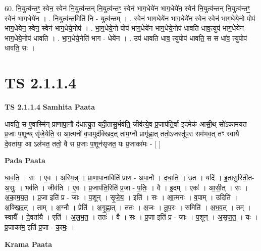 \documentclass[17pt]{extarticle}
\begin{document}
60. नि॒युत्व॑न्तꣳ॒॒ स्वेन॒ स्वेन॑ नि॒युत्व॑न्तन् नि॒युत्व॑न्तꣳ॒॒ स्वेन॑ भाग॒धेये॑न भाग॒धेये॑न॒ स्वेन॑ नि॒युत्व॑न्तन् नि॒युत्व॑न्तꣳ॒॒ स्वेन॑ भाग॒धेये॑न । . नि॒युत्व॑न्त॒मिति॑ नि - युत्व॑न्तम् । . स्वेन॑ भाग॒धेये॑न भाग॒धेये॑न॒ स्वेन॒ स्वेन॑ भाग॒धेये॒नो पोप॑ भाग॒धेये॑न॒ स्वेन॒ स्वेन॑ भाग॒धेये॒नोप॑ । . भा॒ग॒धेये॒नो पोप॑ भाग॒धेये॑न भाग॒धेये॒नोप॑ धावति धाव॒त्युप॑ भाग॒धेये॑न भाग॒धेये॒नोप॑ धावति । . भा॒ग॒धेये॒नेति॑ भाग - धेये॑न । . उप॑ धावति धाव॒ त्युपोप॑ धावति॒ स स धा॑व॒ त्युपोप॑ धावति॒ सः । \newline
\pagebreak
{}

\section{ TS 2.1.1.4 }

\textbf{TS 2.1.1.4 } \newline
\textbf{Samhita Paata} \newline

धावति॒ स ए॒वास्मि॑न् प्राणापा॒नौ द॑धात्यु॒त यदी॒तासु॒र्भव॑ति॒ जीव॑त्ये॒व प्र॒जाप॑ति॒र्वा इ॒दमेक॑ आसी॒थ् सो॑ऽकामयत प्र॒जाः प॒शून्थ् सृ॑जे॒येति॒ स आ॒त्मनो॑ व॒पामुद॑क्खिद॒त् ताम॒ग्नौ प्रागृ॑ह्णा॒त् ततो॒ऽजस्तू॑प॒रः सम॑भव॒त् तꣳ स्वायै॑ दे॒वता॑या॒ आ ऽल॑भत॒ ततो॒ वै स प्र॒जाः प॒शून॑सृजत॒ यः प्र॒जाका॑मः - [  ] \newline

\textbf{Pada Paata} \newline

धा॒व॒ति॒ । सः । ए॒व । अ॒स्मि॒न्न् । प्रा॒णा॒पा॒नाविति॑ प्राण - अ॒पा॒नौ । द॒धा॒ति॒ । उ॒त । यदि॑ । इ॒तासु॒रिती॒त-अ॒सुः॒ । भव॑ति । जीव॑ति । ए॒व । प्र॒जाप॑ति॒रिति॑ प्र॒जा - प॒तिः॒ । वै । इ॒दम् । एकः॑ । आ॒सी॒त् । सः । अ॒का॒म॒य॒त॒ । प्र॒जा इति॑ प्र - जाः । प॒शून् । सृ॒जे॒य॒ । इति॑ । सः । आ॒त्मनः॑ । व॒पाम् । उदिति॑ । अ॒क्खि॒द॒त् । ताम् । अ॒ग्नौ । प्रेति॑ । अ॒गृ॒ह्णा॒त् । ततः॑ । अ॒जः । तू॒प॒रः । समिति॑ । अ॒भ॒व॒त् । तम् । स्वायै᳚ । दे॒वता॑यै । एति॑ । अ॒ल॒भ॒त॒ । ततः॑ । वै । सः । प्र॒जा इति॑ प्र - जाः । प॒शून् । अ॒सृ॒ज॒त॒ । यः । प्र॒जाका॑म॒ इति॑ प्र॒जा - का॒मः॒ ।  \newline


\textbf{Krama Paata} \newline
\end{document}
